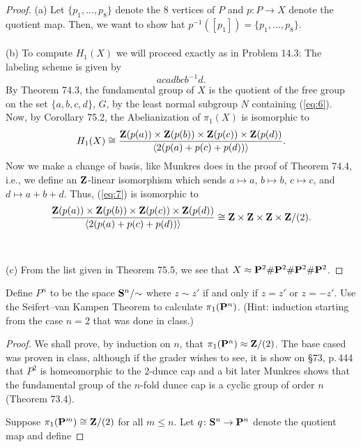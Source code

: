 \begin{proof}
(a) Let $\{p_1,...,p_8\}$ denote the $8$ vertices of $P$ and $p\colon P\to
X$ denote the quotient map. Then, we want to show hat
$p^{-1}([p_1])=\{p_1,...,p_8\}$.
\\\\
(b) To compute $H_1(X)$ we will proceed exactly as in Problem 14.3: The
labeling scheme is given by
\begin{equation}
\label{eq:6}
acadbcb^{-1}d.
\end{equation}
By Theorem 74.3, the fundamental group of $X$ is the quotient of the free
group on the set $\{a,b,c,d\}$, $G$, by the least normal subgroup $N$
containing (\ref{eq:6}). Now, by Corollary 75.2, the Abelianization of
$\pi_1(X)$ is isomorphic to
\begin{equation}
\label{eq:7}
H_1(X)\cong
\frac{\mathbf{Z}(p(a))\times\mathbf{Z}(p(b))\times\mathbf{Z}(p(c))\times\mathbf{Z}(p(d))}
{\left<2(p(a)+p(c)+p(d))\right>}.
\end{equation}
Now we make a change of basis, like Munkres does in the proof of Theorem
74.4, i.e., we define an $\mathbf{Z}$-linear isomorphism which sends $a\mapsto a$,
$b\mapsto b$, $c\mapsto c$, and $d\mapsto a+b+d$. Thus, (\ref{eq:7}) is
isomorphic to
\[
\frac{\mathbf{Z}(p(a))\times\mathbf{Z}(p(b))\times\mathbf{Z}(p(c))\times\mathbf{Z}(p(d))}
{\left<2(p(a)+p(c)+p(d))\right>}\cong\mathbf{Z}\times\mathbf{Z}\times\mathbf{Z}\times\mathbf{Z}/(2).
\]
\\\\
(c) From the list given in Theorem 75.5, we see that
$X\approx\mathbf{P}^2\#\mathbf{P}^2\#\mathbf{P}^2\#\mathbf{P}^2$.
\end{proof}
\newpage
\begin{problem}[A]
Define $P^n$ to be the space $\mathbf{S}^n/{\sim}$ where $z\sim z'$ if and only
if $z=z'$ or $z=-z'$. Use the Seifert--van Kampen Theorem to calculate
$\pi_1(\mathbf{P}^n)$. (Hint: induction starting from the case $n=2$ that was
done in class.)
\end{problem}
\begin{proof}
We shall prove, by induction on $n$, that
$\pi_1(\mathbf{P}^n)\approx\mathbf{Z}/(2)$. The base cased was proven in class,
although if the grader wishes to see, it is show on \S73, p.\,444 that
$P^2$ is homeomorphic to the $2$-dunce cap and a bit later Munkres shows
that the fundamental group of the $n$-fold dunce cap is a cyclic group of
order $n$ (Theorem 73.4).

Suppose $\pi_1(\mathbf{P}^m)\cong\mathbf{Z}/(2)$ for all $m\leq n$. Let
$q\colon\mathbf{S}^n\to\mathbf{P}^n$ denote the quotient map and define
\end{proof}
